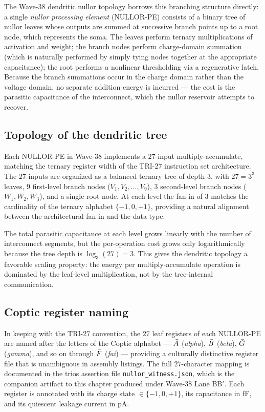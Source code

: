 The Wave-38 dendritic nullor topology borrows this branching structure directly: a
single \emph{nullor processing element} (NULLOR-PE) consists of a binary tree of
nullor leaves whose outputs are summed at successive branch points up to a root node,
which represents the soma.  The leaves perform ternary multiplications of activation
and weight; the branch nodes perform charge-domain summation (which is naturally
performed by simply tying nodes together at the appropriate capacitance); the root
performs a nonlinear thresholding via a regenerative latch.  Because the branch
summations occur in the charge domain rather than the voltage domain, no separate
addition energy is incurred --- the cost is the parasitic capacitance of the
interconnect, which the nullor reservoir attempts to recover.

\subsection{Topology of the dendritic tree}
\label{subsec:dendritic_topology}

Each NULLOR-PE in Wave-38 implements a $27$-input multiply-accumulate, matching the
ternary register width of the TRI-27 instruction set architecture.  The $27$ inputs
are organized as a balanced ternary tree of depth $3$, with $27 = 3^3$ leaves, $9$
first-level branch nodes ($V_1, V_2, \ldots, V_9$), $3$ second-level branch nodes
($W_1, W_2, W_3$), and a single root node.  At each level the fan-in of $3$ matches
the cardinality of the ternary alphabet $\{-1, 0, +1\}$, providing a natural
alignment between the architectural fan-in and the data type.

The total parasitic capacitance at each level grows linearly with the number of
interconnect segments, but the per-operation cost grows only logarithmically because
the tree depth is $\log_3(27) = 3$.  This gives the dendritic topology a favorable
scaling property: the energy per multiply-accumulate operation is dominated by the
leaf-level multiplication, not by the tree-internal communication.

\subsection{Coptic register naming}
\label{subsec:coptic}

In keeping with the TRI-27 convention, the $27$ leaf registers of each NULLOR-PE are
named after the letters of the Coptic alphabet --- $\Bar{A}$ (\textit{alpha}),
$\Bar{B}$ (\textit{beta}), $\Bar{G}$ (\textit{gamma}), and so on through
$\Bar{F}$ (\textit{fai}) --- providing a culturally distinctive register file that
is unambiguous in assembly listings.  The full $27$-character mapping is
documented in the trios assertion file \texttt{nullor\_witness.json}, which is the
companion artifact to this chapter produced under Wave-38 Lane BB$'$.  Each register
is annotated with its charge state $\in \{-1, 0, +1\}$, its capacitance in fF, and
its quiescent leakage current in pA.

